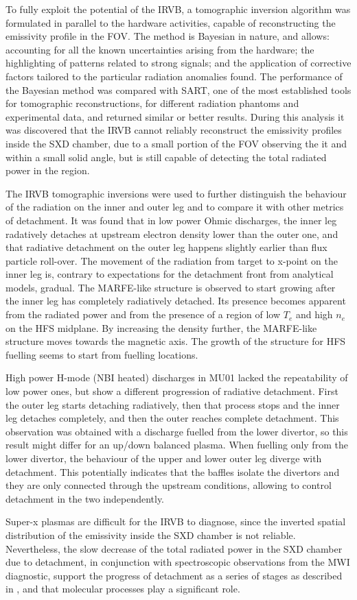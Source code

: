 To fully exploit the potential of the IRVB, a tomographic inversion algorithm was formulated in parallel to the hardware activities, capable of reconstructing the emissivity profile in the FOV. The method is Bayesian in nature, and allows: accounting for all the known uncertainties arising from the hardware; the highlighting of patterns related to strong signals; and the application of corrective factors tailored to the particular radiation anomalies found. The performance of the Bayesian method was compared with SART, one of the most established tools for tomographic reconstructions, for different radiation phantoms and experimental data, and returned similar or better results. During this analysis it was discovered that the IRVB cannot reliably reconstruct the emissivity profiles inside the SXD chamber, due to a small portion of the FOV observing the it and within a small solid angle, but is still capable of detecting the total radiated power in the region.

The IRVB tomographic inversions were used to further distinguish the behaviour of the radiation on the inner and outer leg and to compare it with other metrics of detachment. It was found that in low power Ohmic discharges, the inner leg radatively detaches at upstream electron density lower than the outer one, and that radiative detachment on the outer leg happens slightly earlier than flux particle roll-over. The movement of the radiation from target to x-point on the inner leg is, contrary to expectations for the detachment front from analytical models\cite{Lipschultz2016}, gradual. The MARFE-like structure is observed to start growing after the inner leg has completely radiatively detached. Its presence becomes apparent from the radiated power and from the presence of a region of low $T_e$ and high $n_e$ on the HFS midplane. By increasing the density further, the MARFE-like structure moves towards the magnetic axis. The growth of the structure for HFS fuelling seems to start from fuelling locations.

High power H-mode (NBI heated) discharges in MU01 lacked the repeatability of low power ones, but show a different progression of radiative detachment. First the outer leg starts detaching radiatively, then that process stops and the inner leg detaches completely, and then the outer reaches complete detachment. This observation was obtained with a discharge fuelled from the lower divertor, so this result might differ for an up/down balanced plasma. When fuelling only from the lower divertor, the behaviour of the upper and lower outer leg diverge with detachment. This potentially indicates that the baffles isolate the divertors and they are only connected through the upstream conditions, allowing to control detachment in the two independently.

Super-x plasmas are difficult for the IRVB to diagnose, since the inverted spatial distribution of the emissivity inside the SXD chamber is not reliable. Nevertheless, the slow decrease of the total radiated power in the SXD chamber due to detachment, in conjunction with spectroscopic observations from the MWI diagnostic, support the progress of detachment as a series of stages as described in \cite{Verhaegh2022}, and that molecular processes play a significant role.